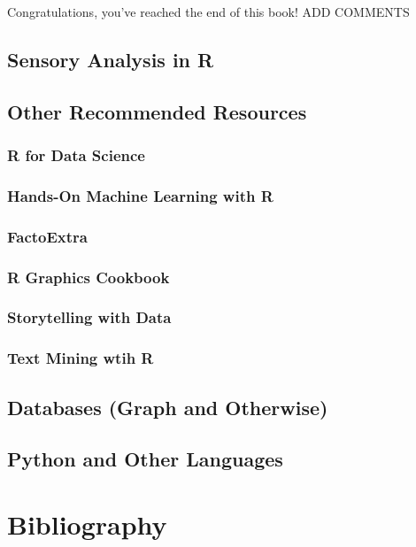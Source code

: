 \documentclass[
]{book}
\begin{document}
Congratulations, you've reached the end of this book! ADD COMMENTS

\hypertarget{sensory-analysis-in-r}{%
\section{Sensory Analysis in R}\label{sensory-analysis-in-r}}

\hypertarget{other-recommended-resources}{%
\section{Other Recommended Resources}\label{other-recommended-resources}}

\hypertarget{r-for-data-science}{%
\subsection{R for Data Science}\label{r-for-data-science}}

\hypertarget{hands-on-machine-learning-with-r}{%
\subsection{Hands-On Machine Learning with R}\label{hands-on-machine-learning-with-r}}

\hypertarget{factoextra}{%
\subsection{FactoExtra}\label{factoextra}}

\hypertarget{r-graphics-cookbook}{%
\subsection{R Graphics Cookbook}\label{r-graphics-cookbook}}

\hypertarget{storytelling-with-data}{%
\subsection{Storytelling with Data}\label{storytelling-with-data}}

\hypertarget{text-mining-wtih-r}{%
\subsection{Text Mining wtih R}\label{text-mining-wtih-r}}

\hypertarget{databases-graph-and-otherwise}{%
\section{Databases (Graph and Otherwise)}\label{databases-graph-and-otherwise}}

\hypertarget{python-and-other-languages}{%
\section{Python and Other Languages}\label{python-and-other-languages}}

\hypertarget{bibliography}{%
\chapter*{Bibliography}\label{bibliography}}

  
\end{document}
